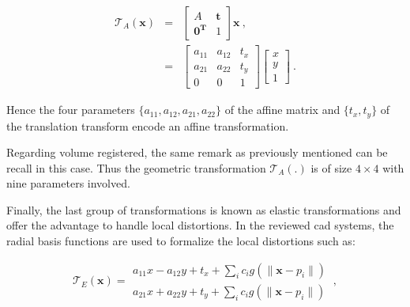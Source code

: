 \begin{eqnarray}
	\mathcal{T}_A(\mathbf{x}) & = & \begin{bmatrix}
		A & \mathbf{t} \\
		\mathbf{0^T} & 1
	\end{bmatrix} \mathbf{x} \ , \nonumber \\
	& = & \begin{bmatrix}
		a_{11} & a_{12} & t_x \\
		a_{21} & a_{22} & t_y \\
		0 & 0 & 1
	\end{bmatrix}\begin{bmatrix}
		x \\
		y \\
		1
	\end{bmatrix} \ . \label{eq:afftra}%
\end{eqnarray}

%
%

Hence the four parameters $\{a_{11},a_{12},a_{21},a_{22}\}$ of the affine matrix and $\{ t_x, t_y \}$ of the translation transform encode an affine transformation.

Regarding volume registered, the same remark as previously mentioned can be recall in this case. Thus the geometric transformation $\mathcal{T}_A(.)$ is of size $4 \times 4$ with nine parameters involved.

Finally, the last group of transformations is known as elastic transformations and offer the advantage to handle local distortions. In the reviewed \ac{cad} systems, the radial basis functions are used to formalize the local distortions such as:

\begin{equation}
	\mathcal{T}_E(\mathbf{x}) = \begin{matrix}
	a_{11} x - a_{12} y + t_x + \sum_i c_i g(\| \mathbf{x} - p_i \|) \\
	a_{21} x + a_{22} y + t_y + \sum_i c_i g(\| \mathbf{x} - p_i \|)
	\end{matrix} \ ,
\end{equation}

